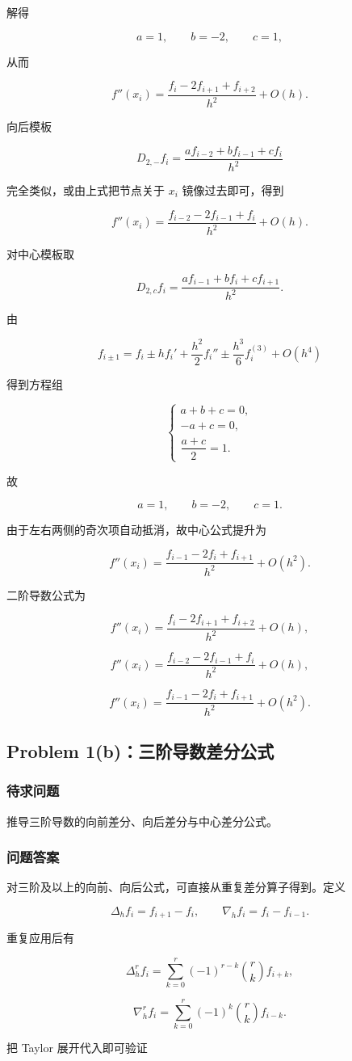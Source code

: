 \documentclass[12pt,a4paper,fontset=none]{ctexart}
\newcommand{\problem}[1]{\subsection{#1}}
\newcommand{\blocktitle}[1]{\subsubsection{#1}}
\begin{document}
解得

\[
a=1,\qquad b=-2,\qquad c=1,
\]

从而

\[
f''(x_i)=\frac{f_i-2f_{i+1}+f_{i+2}}{h^2}+O(h).
\]

向后模板

\[
D_{2,-}f_i=\frac{a f_{i-2}+b f_{i-1}+c f_i}{h^2}
\]

完全类似，或由上式把节点关于 \(x_i\) 镜像过去即可，得到

\[
f''(x_i)=\frac{f_{i-2}-2f_{i-1}+f_i}{h^2}+O(h).
\]

对中心模板取

\[
D_{2,c}f_i=\frac{a f_{i-1}+b f_i+c f_{i+1}}{h^2}.
\]

由

\[
f_{i\pm1}=f_i\pm h f_i'+\frac{h^2}{2}f_i''\pm\frac{h^3}{6}f_i^{(3)}+O(h^4)
\]

得到方程组

\[
\begin{cases}
a+b+c=0,\\
-a+c=0,\\
\dfrac{a+c}{2}=1.
\end{cases}
\]

故

\[
a=1,\qquad b=-2,\qquad c=1.
\]

由于左右两侧的奇次项自动抵消，故中心公式提升为

\[
f''(x_i)=\frac{f_{i-1}-2f_i+f_{i+1}}{h^2}+O(h^2).
\]

二阶导数公式为

\[
f''(x_i)=\frac{f_i-2f_{i+1}+f_{i+2}}{h^2}+O(h),
\]

\[
f''(x_i)=\frac{f_{i-2}-2f_{i-1}+f_i}{h^2}+O(h),
\]

\[
f''(x_i)=\frac{f_{i-1}-2f_i+f_{i+1}}{h^2}+O(h^2).
\]


\problem{Problem 1(b)：三阶导数差分公式}

\blocktitle{待求问题}
推导三阶导数的向前差分、向后差分与中心差分公式。

\blocktitle{问题答案}
对三阶及以上的向前、向后公式，可直接从重复差分算子得到。定义

\[
\Delta_h f_i=f_{i+1}-f_i,\qquad \nabla_h f_i=f_i-f_{i-1}.
\]

重复应用后有

\[
\Delta_h^r f_i=\sum_{k=0}^{r}(-1)^{r-k}\binom{r}{k}f_{i+k},
\]

\[
\nabla_h^r f_i=\sum_{k=0}^{r}(-1)^k\binom{r}{k}f_{i-k}.
\]

把 Taylor 展开代入即可验证
\end{document}
